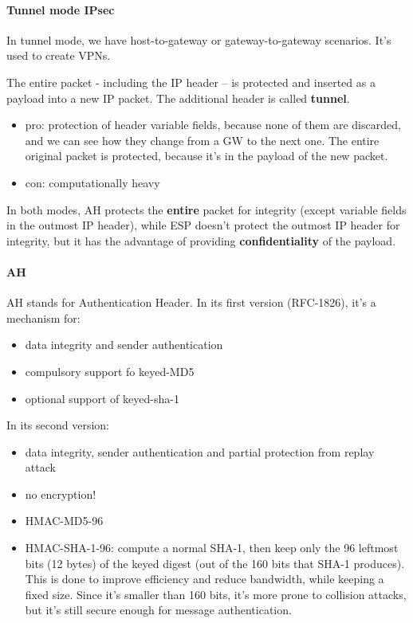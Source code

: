 \paragraph{Tunnel mode IPsec}
In tunnel mode, we have host-to-gateway or gateway-to-gateway scenarios. It's used to create VPNs.

The entire packet - including the IP header – is protected and inserted as a
payload into a new IP packet. The additional header is called \textbf{tunnel}.
\begin{itemize}
    \item pro: protection of header variable fields, because none of them are discarded, and we can see how they change from a GW to the next one. The entire original packet is protected, because it's in the payload of the new packet.

    \item con: computationally heavy
\end{itemize}

In both modes, AH protects the \textbf{entire} packet for integrity (except variable fields in the outmost IP header), while ESP doesn't protect the outmost IP header for integrity, but it has the advantage of providing \textbf{confidentiality} of the payload.

\paragraph{AH}
AH stands for Authentication Header. In its first version (RFC-1826), it's a mechanism for:
\begin{itemize}
    \item data integrity and sender authentication
    \item compulsory support fo keyed-MD5
    \item optional support of keyed-sha-1
\end{itemize}

In its second version:
\begin{itemize}
    \item data integrity, sender authentication and partial protection from replay attack
    \item no encryption!
    \item HMAC-MD5-96
    \item HMAC-SHA-1-96: compute a normal SHA-1, then keep only the 96 leftmost bits (12 bytes) of the keyed digest (out of the 160 bits that SHA-1 produces). This is done to improve efficiency and reduce bandwidth, while keeping a fixed size. Since it's smaller than 160 bits, it's more prone to collision attacks, but it's still secure enough for message authentication.
\end{itemize}

